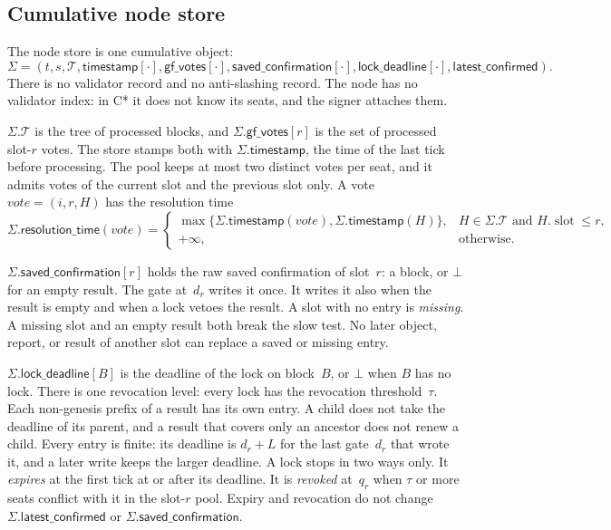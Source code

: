 \documentclass{article}
\theoremstyle{plain}
\theoremstyle{definition}
\theoremstyle{remark}
\newcommand{\slot}{\operatorname{slot}}
\newcommand{\T}{\mathcal T}
\newcommand{\gfPool}{\mathsf{gf\_votes}}
\newcommand{\latestConfirmed}{\mathsf{latest\_confirmed}}
\newcommand{\timestamp}{\mathsf{timestamp}}
\newcommand{\resolutionTime}{\mathsf{resolution\_time}}
\newcommand{\savedConfirmation}{\mathsf{saved\_confirmation}}
\newcommand{\lockDeadline}{\mathsf{lock\_deadline}}
\begin{document}
\subsection{Cumulative node store}\label{sec:complete-store}

The node store is one cumulative object:
\[
 \Sigma=(t,s,\T,\timestamp[\cdot],\gfPool[\cdot],
 \savedConfirmation[\cdot],\lockDeadline[\cdot],\latestConfirmed).
\]
There is no validator record and no anti-slashing record.  The node has
no validator index: in C* it does not know its seats, and the signer
attaches them.

$\Sigma.\T$ is the tree of processed blocks, and $\Sigma.\gfPool[r]$ is
the set of processed slot-$r$ votes.  The store stamps both with
$\Sigma.\timestamp$, the time of the last tick before processing.  The
pool keeps at most two distinct votes per seat, and it admits votes of
the current slot and the previous slot only.  A vote $\mathit{vote}=(i,r,H)$
has the resolution time
\[
 \Sigma.\resolutionTime(\mathit{vote})=
 \begin{cases}
  \max\{\Sigma.\timestamp(\mathit{vote}),\Sigma.\timestamp(H)\},
    & H\in\Sigma.\T\text{ and }H.\slot\leq r,\\
  +\infty, & \text{otherwise}.
 \end{cases}
\]

$\Sigma.\savedConfirmation[r]$ holds the raw saved confirmation of slot~$r$: a block,
or $\bot$ for an empty result.  The gate at~$d_r$ writes it once.  It
writes it also when the result is empty and when a lock vetoes the
result.  A slot with no entry is \emph{missing}.  A missing slot and an
empty result both break the slow test.  No later object, report, or
result of another slot can replace a saved or missing entry.

$\Sigma.\lockDeadline[B]$ is the deadline of the lock on block~$B$, or $\bot$
when $B$ has no lock.  There is one revocation level: every lock has the
revocation threshold~$\tau$.  Each non-genesis prefix of a result has its
own entry.  A child does not take the deadline of its parent, and a
result that covers only an ancestor does not renew a child.  Every
entry is finite: its deadline is $d_r+L$ for the last gate~$d_r$ that
wrote it, and a later write keeps the larger deadline.  A lock stops in
two ways only.  It \emph{expires} at the first tick at or after its
deadline.  It is \emph{revoked} at~$q_r$ when $\tau$ or more seats
conflict with it in the slot-$r$ pool.  Expiry and revocation do not change
$\Sigma.\latestConfirmed$ or $\Sigma.\savedConfirmation$.
\end{document}
